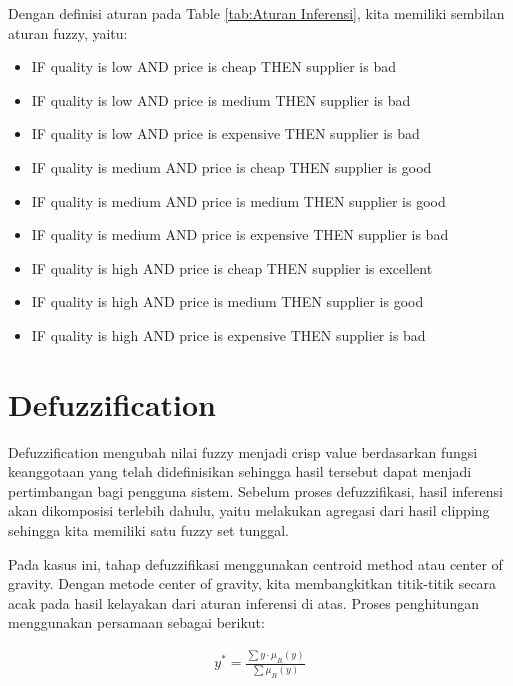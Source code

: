 \documentclass[11pt]{report}
\begin{document}
        Dengan definisi aturan pada Table \ref{tab:Aturan Inferensi}, kita memiliki sembilan aturan fuzzy, yaitu:

        \begin{itemize}
            \item IF quality is low AND price is cheap THEN supplier is bad
            \item IF quality is low AND price is medium THEN supplier is bad
            \item IF quality is low AND price is expensive THEN supplier is bad
            \item IF quality is medium AND price is cheap THEN supplier is good
            \item IF quality is medium AND price is medium THEN supplier is good
            \item IF quality is medium AND price is expensive THEN supplier is bad
            \item IF quality is high AND price is cheap THEN supplier is excellent
            \item IF quality is high AND price is medium THEN supplier is good
            \item IF quality is high AND price is expensive THEN supplier is bad
        \end{itemize}

    \section{Defuzzification}
        Defuzzification mengubah nilai fuzzy menjadi crisp value berdasarkan fungsi keanggotaan yang telah didefinisikan sehingga hasil tersebut dapat menjadi pertimbangan bagi pengguna sistem. Sebelum proses defuzzifikasi, hasil inferensi akan dikomposisi terlebih dahulu, yaitu melakukan agregasi dari hasil clipping sehingga kita memiliki satu fuzzy set tunggal.

        Pada kasus ini, tahap defuzzifikasi menggunakan centroid method atau center of gravity. Dengan metode center of gravity, kita membangkitkan titik-titik secara acak pada hasil kelayakan dari aturan inferensi di atas. Proses penghitungan menggunakan persamaan sebagai berikut:

        \begin{equation}
            \begin{split}
                y^*= \frac{\sum y \cdot \mu_R(y)}{\sum \mu_R(y)}
            \end{split}
        \end{equation}
\end{document}
